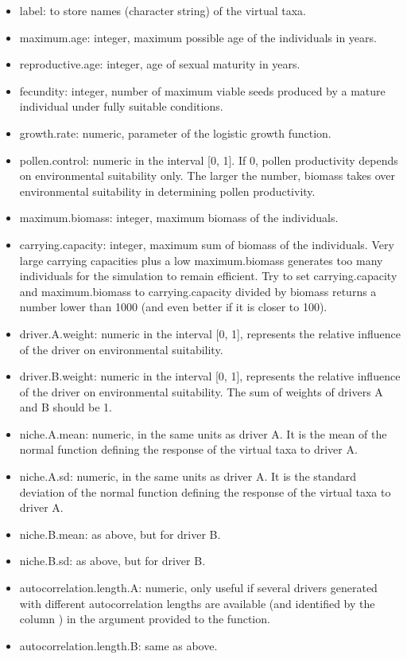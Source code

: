 \documentclass[letterpaper]{book}
\begin{document}
\begin{Details}
\begin{itemize}
\item label: to store names (character string) of the virtual taxa.
\item maximum.age: integer, maximum possible age of the individuals in years.
\item reproductive.age: integer, age of sexual maturity in years.
\item fecundity: integer, number of maximum viable seeds produced by a mature individual under fully suitable conditions.
\item growth.rate: numeric, parameter of the logistic growth function.
\item pollen.control: numeric in the interval [0, 1]. If 0, pollen productivity depends on environmental suitability only. The larger the number, biomass takes over environmental suitability in determining pollen productivity.
\item maximum.biomass: integer, maximum biomass of the individuals.
\item carrying.capacity: integer, maximum sum of biomass of the individuals. Very large carrying capacities plus a low maximum.biomass generates too many individuals for the simulation to remain efficient. Try to set carrying.capacity and maximum.biomass to carrying.capacity divided by biomass returns a number lower than 1000 (and even better if it is closer to 100).
\item driver.A.weight: numeric in the interval [0, 1], represents the relative influence of the driver on environmental suitability.
\item driver.B.weight: numeric in the interval [0, 1], represents the relative influence of the driver on environmental suitability. The sum of weights of drivers A and B should be 1.
\item niche.A.mean: numeric, in the same units as driver A. It is the mean of the normal function defining the response of the virtual taxa to driver A.
\item niche.A.sd: numeric, in the same units as driver A. It is the standard deviation of the normal function defining the response of the virtual taxa to driver A.
\item niche.B.mean: as above, but for driver B.
\item niche.B.sd: as above, but for driver B.
\item autocorrelation.length.A: numeric, only useful if several drivers generated with different autocorrelation lengths are available (and identified by the column ) in the  argument provided to the  function.
\item autocorrelation.length.B: same as above.

\end{itemize}

\end{Details}
\end{document}

